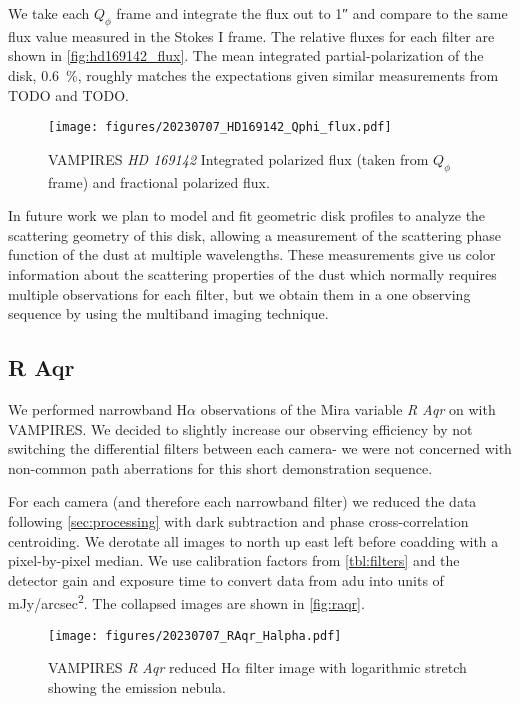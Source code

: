 We take each $Q_\phi$ frame and integrate the flux out to \ang{;;1} and compare to the same flux value measured in the Stokes I frame. The relative fluxes for each filter are shown in \autoref{fig:hd169142_flux}. The mean integrated partial-polarization of the disk, \SI{0.6}{\%}, roughly matches the expectations given similar measurements from TODO and TODO. 

\begin{figure}
    \centering
    \texttt{[image: figures/20230707\_HD169142\_Qphi\_flux.pdf]}
    \caption{ VAMPIRES \textit{HD 169142} Integrated polarized flux (taken from $Q_\phi$ frame) and fractional polarized flux.\label{fig:hd169142_flux}}
\end{figure}

In future work we plan to model and fit geometric disk profiles to analyze the scattering geometry of this disk, allowing a measurement of the scattering phase function of the dust at multiple wavelengths. These measurements give us color information about the scattering properties of the dust which normally requires multiple observations for each filter, but we obtain them in a one observing sequence by using the multiband imaging technique.

\subsection{R Aqr\label{sec:raqr}}

We performed narrowband H$\alpha$ observations of the Mira variable \textit{R Aqr} on  with VAMPIRES. We decided to slightly increase our observing efficiency by not switching the differential filters between each camera- we were not concerned with non-common path aberrations for this short demonstration sequence.

For each camera (and therefore each narrowband filter) we reduced the data following \autoref{sec:processing} with dark subtraction and phase cross-correlation centroiding. We derotate all images to north up east left before coadding with a pixel-by-pixel median. We use calibration factors from \autoref{tbl:filters} and the detector gain and exposure time to convert data from \si{adu} into units of \si{mJy/arcsec^2}. The collapsed images are shown in \autoref{fig:raqr}.

\begin{figure}
    \centering
    \texttt{[image: figures/20230707\_RAqr\_Halpha.pdf]}
    \caption{ VAMPIRES \textit{R Aqr} reduced H$\alpha$ filter image with logarithmic stretch showing the emission nebula.\label{fig:raqr}}
\end{figure}

